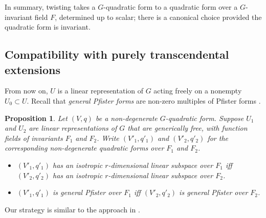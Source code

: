 \documentclass[12pt]{amsart}
\numberwithin{equation}{section}
\theoremstyle{plain}
\newtheorem{prop}{Proposition}[section]
\theoremstyle{definition}
\theoremstyle{remark}
\begin{document}
In summary, twisting takes a $G$-quadratic form to 
a quadratic form over a $G$-invariant field $F$, determined up to scalar; there is a canonical choice provided the quadratic
form is invariant. 

\subsection*{Compatibility with purely transcendental extensions}
From now on, $U$ is a linear representation of $G$
acting freely on a nonempty $U_0 \subset U$.
Recall that {\em general Pfister forms} are non-zero
multiples of Pfister forms \cite[\S{6A}]{EKMbook}.
\begin{prop} \label{prop:puretran}
Let $(V,q)$ be a non-degenerate $G$-quadratic form.
Suppose $U_1$ and $U_2$ are linear representations of $G$
that are generically free, with function fields
of invariants $F_1$ and $F_2$. Write $(V'_1,q'_1)$ and
$(V'_2,q'_2)$ for the corresponding non-degenerate
quadratic forms over $F_1$ and $F_2$.
\begin{itemize}
\item{$(V'_1,q'_1)$ has an isotropic $r$-dimensional linear subspace over $F_1$ iff
$(V'_2,q'_2)$ has an isotropic $r$-dimensional linear subspace over $F_2$.}
\item{$(V'_1,q'_1)$ is general Pfister over $F_1$ iff
$(V'_2,q'_2)$ is general Pfister over $F_2$.}
\end{itemize}
\end{prop}
Our strategy is similar to the approach in \cite[{\S}2]{KrTs26}.
\end{document}
